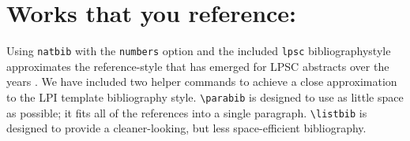 \documentclass[twoside, 10pt]{article}
\begin{document}
\section*{Works that you reference:}

Using \texttt{natbib} with the \texttt{numbers} option and the included
\texttt{lpsc} bibliographystyle approximates the reference-style
that has emerged for LPSC abstracts over the years \citep{LPSC}. 
 We have included two helper commands to achieve a 
close approximation to the LPI template bibliography style.
\verb=\parabib= is designed to use as little space as possible; it fits all 
of the references into a single paragraph. \verb=\listbib= is designed to 
provide a cleaner-looking, but less space-efficient bibliography.



\end{document}
